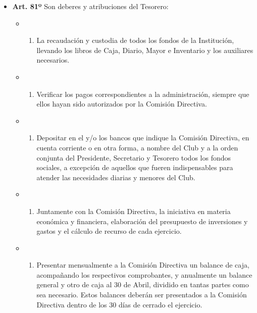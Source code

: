 \documentclass[]{book}
\providecommand{\tightlist}{%
  \setlength{\itemsep}{0pt}\setlength{\parskip}{0pt}}
\begin{document}
\begin{itemize}
\tightlist
\item
  \textbf{Art. 81º}
  Son deberes y atribuciones del Tesorero:

  \begin{itemize}
  \item
    \begin{enumerate}
    \def\labelenumi{\alph{enumi})}
    \tightlist
    \item
      La recaudación y custodia de todos los fondos de la Institución, llevando los libros de Caja, Diario, Mayor e Inventario y los auxiliares necesarios.
    \end{enumerate}
  \item
    \begin{enumerate}
    \def\labelenumi{\alph{enumi})}
    \setcounter{enumi}{1}
    \tightlist
    \item
      Verificar los pagos correspondientes a la administración, siempre que ellos hayan sido autorizados por la Comisión Directiva.
    \end{enumerate}
  \item
    \begin{enumerate}
    \def\labelenumi{\alph{enumi})}
    \setcounter{enumi}{2}
    \tightlist
    \item
      Depositar en el y/o los bancos que indique la Comisión Directiva, en cuenta corriente o en otra forma, a nombre del Club y a la orden conjunta del Presidente, Secretario y Tesorero todos los fondos sociales, a excepción de aquellos que fueren indispensables para atender las necesidades diarias y menores del Club.
    \end{enumerate}
  \item
    \begin{enumerate}
    \def\labelenumi{\alph{enumi})}
    \setcounter{enumi}{3}
    \tightlist
    \item
      Juntamente con la Comisión Directiva, la iniciativa en materia económica y financiera, elaboración del presupuesto de inversiones y gastos y el cálculo de recurso de cada ejercicio.
    \end{enumerate}
  \item
    \begin{enumerate}
    \def\labelenumi{\alph{enumi})}
    \setcounter{enumi}{4}
    \tightlist
    \item
      Presentar mensualmente a la Comisión Directiva un balance de caja, acompañando los respectivos comprobantes, y anualmente un balance general y otro de caja al 30 de Abril, dividido en tantas partes como sea necesario. Estos balances deberán ser presentados a la Comisión Directiva dentro de los 30 días de cerrado el ejercicio.

\end{enumerate}
\end{itemize}
\end{itemize}
\end{document}
